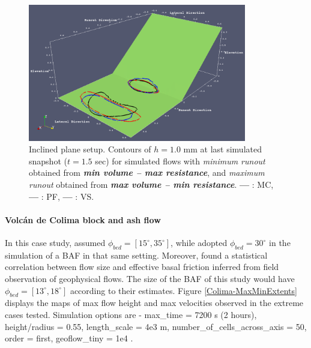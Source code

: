 \documentclass{article}
\begin{document}
\begin{figure}[H]
	\centering
    \includegraphics[width=0.85\textwidth]{Figures/MaxMinRunout.png}
    \caption{Inclined plane setup. Contours of $h = 1.0$ mm at last simulated snapshot ($t = 1.5$ sec) for simulated flows with \emph{minimum runout} obtained from \emph{\textbf{min volume -- max resistance}}, and \emph{maximum runout} obtained from \emph{\textbf{max volume -- min resistance}}. {\color{blue} \textbf{---}} : MC, {\color{red} \textbf{---}} : PF, \textbf{---} : VS.}\label{fig:Ramp-MaxMinRunouts}
\end{figure}

\paragraph{Volc{\'a}n de Colima block and ash flow}
In this case study, \cite{Dalbey2008} assumed $\phi_{bed}=[15^\mathrm{\circ}, 35^\mathrm{\circ}]$, while \citep{Capra2011} adopted $\phi_{bed}=30^\mathrm{\circ}$ in the simulation of a BAF in that same setting. Moreover, \cite{Spiller2014,Bayarri2015,Ogburn2016} found a statistical correlation between flow size and effective basal friction inferred from field observation of geophysical flows. The size of the BAF of this study would have $\phi_{bed}=[13^\mathrm{\circ}, 18^\mathrm{\circ}]$ according to their estimates. Figure \ref{Colima-MaxMinExtents} displays the maps of max flow height and max velocities observed in the extreme cases tested. Simulation options are - max\_time = 7200 s (2 hours), height/radius = 0.55, length\_scale = 4e3 m, number\_of\_cells\_across\_axis = 50, order = first, geoflow\_tiny = 1e4 \citep{Patra2005,Aghakhani2016}.

\end{document}
